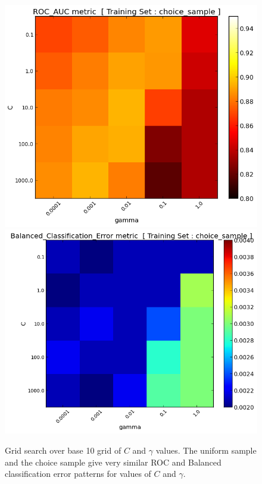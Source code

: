 \documentclass[final,3p,times,twocolumn]{elsarticle}
\begin{document}
\begin{figure}
\includegraphics[scale=0.51]{Images/ROC_AUC_choice_sample_grid10.png} 
\includegraphics[scale=0.51]{Images/Balanced_Classification_Error_choice_sample_grid10.png} 
\caption{Grid search over base 10 grid of $C$ and $\gamma$ values. The uniform sample and the choice sample give very similar ROC and Balanced classification error patterns for values of $C$ and $\gamma$.}
\label{metrics_grid10}
\end{figure}
\end{document}
